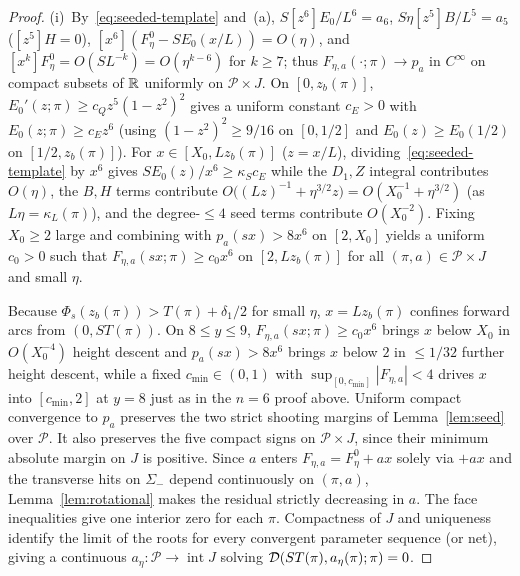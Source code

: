 \begin{proof}
(i)~By~\eqref{eq:seeded-template} and~(a), $S[z^6]E_0/L^6=a_6$, $S\eta[z^5]B/L^5=a_5$ ($[z^5]H=0$), $[x^6](F_\eta^0-SE_0(x/L))=O(\eta)$, and $[x^k]F_\eta^0=O(SL^{-k})=O(\eta^{k-6})$ for $k\ge 7$; thus $F_{\eta,a}(\cdot;\pi)\to p_a$ in $C^\infty$ on compact subsets of $\mathbb{R}$ uniformly on $\mathcal{P}\times J$. On $[0,z_b(\pi)]$, $E_0'(z;\pi)\ge c_Q z^5(1-z^2)^2$ gives a uniform constant $c_E>0$ with $E_0(z;\pi)\ge c_E z^6$ (using $(1-z^2)^2\ge 9/16$ on $[0,1/2]$ and $E_0(z)\ge E_0(1/2)$ on $[1/2,z_b(\pi)]$). For $x\in[X_0,Lz_b(\pi)]$ ($z=x/L$), dividing~\eqref{eq:seeded-template} by $x^6$ gives $SE_0(z)/x^6\ge\kappa_S c_E$ while the $D_1,Z$ integral contributes $O(\eta)$, the $B,H$ terms contribute $O\big((Lz)^{-1}+\eta^{3/2}z\big)=O(X_0^{-1}+\eta^{3/2})$ (as $L\eta=\kappa_L(\pi)$), and the degree-$\le 4$ seed terms contribute $O(X_0^{-2})$. Fixing $X_0\ge 2$ large and combining with $p_a(sx)>8x^6$ on $[2,X_0]$ yields a uniform $c_0>0$ such that $F_{\eta,a}(sx;\pi)\ge c_0 x^6$ on $[2,Lz_b(\pi)]$ for all $(\pi,a)\in\mathcal{P}\times J$ and small $\eta$.

Because $\Phi_s(z_b(\pi))>T(\pi)+\delta_1/2$ for small $\eta$, $x=Lz_b(\pi)$ confines forward arcs from $(0,ST(\pi))$. On $8\le y\le 9$, $F_{\eta,a}(sx;\pi)\ge c_0 x^6$ brings $x$ below $X_0$ in $O(X_0^{-4})$ height descent and $p_a(sx)>8x^6$ brings $x$ below $2$ in $\le 1/32$ further height descent, while a fixed $c_{\min}\in(0,1)$ with $\sup_{[0,c_{\min}]}|F_{\eta,a}|<4$ drives $x$ into $[c_{\min},2]$ at $y=8$ just as in the $n=6$ proof above. Uniform compact convergence to $p_a$ preserves the two strict shooting margins of Lemma~\ref{lem:seed} over $\mathcal P$. It also preserves the five compact signs on $\mathcal P\times J$, since their minimum absolute margin on $J$ is positive. Since $a$ enters $F_{\eta,a}=F_\eta^0+ax$ solely via $+ax$ and the transverse hits on $\Sigma_-$ depend continuously on $(\pi,a)$, Lemma~\ref{lem:rotational} makes the residual strictly decreasing in $a$. The face inequalities give one interior zero for each $\pi$. Compactness of $J$ and uniqueness identify the limit of the roots for every convergent parameter sequence (or net), giving a continuous $a_\eta:\mathcal{P}\to\operatorname{int}J$ solving $\mathcal{D}(ST(\pi),a_\eta(\pi);\pi)=0$.


\end{proof}
